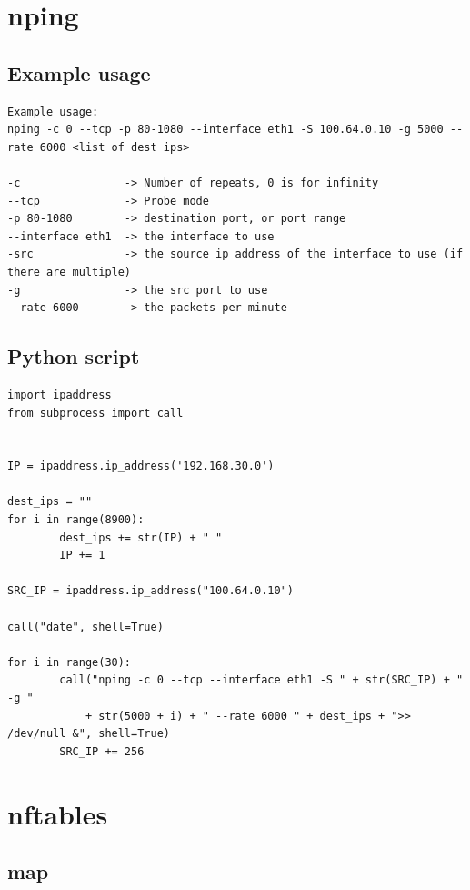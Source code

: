 \documentclass{report}
\begin{document}
\section{nping}\label{nping}

\subsection{Example usage}

\begingroup
\fontsize{9pt}{9pt}\selectfont
\begin{verbatim}
Example usage:
nping -c 0 --tcp -p 80-1080 --interface eth1 -S 100.64.0.10 -g 5000 --rate 6000 <list of dest ips>

-c                -> Number of repeats, 0 is for infinity
--tcp             -> Probe mode
-p 80-1080        -> destination port, or port range
--interface eth1  -> the interface to use
-src              -> the source ip address of the interface to use (if there are multiple)
-g                -> the src port to use
--rate 6000       -> the packets per minute
\end{verbatim}
\endgroup

\subsection{Python script}

\begingroup
\fontsize{9pt}{9pt}\selectfont
\begin{verbatim}
import ipaddress
from subprocess import call


IP = ipaddress.ip_address('192.168.30.0')

dest_ips = ""
for i in range(8900):
        dest_ips += str(IP) + " "
        IP += 1

SRC_IP = ipaddress.ip_address("100.64.0.10")

call("date", shell=True)

for i in range(30):
        call("nping -c 0 --tcp --interface eth1 -S " + str(SRC_IP) + " -g "
        	+ str(5000 + i) + " --rate 6000 " + dest_ips + ">> /dev/null &", shell=True)
        SRC_IP += 256
\end{verbatim}
\endgroup

\section{nftables}\label{nftables-1}

\subsection{map}
\end{document}
